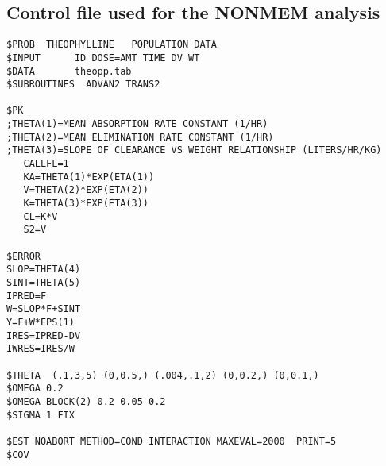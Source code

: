 \newpage
{}
\subsection*{Control file used for the NONMEM analysis}\label{sec:appanalctr}
{\small
\begin{verbatim}
$PROB  THEOPHYLLINE   POPULATION DATA
$INPUT      ID DOSE=AMT TIME DV WT
$DATA       theopp.tab
$SUBROUTINES  ADVAN2 TRANS2 

$PK
;THETA(1)=MEAN ABSORPTION RATE CONSTANT (1/HR)
;THETA(2)=MEAN ELIMINATION RATE CONSTANT (1/HR)
;THETA(3)=SLOPE OF CLEARANCE VS WEIGHT RELATIONSHIP (LITERS/HR/KG)
   CALLFL=1
   KA=THETA(1)*EXP(ETA(1))
   V=THETA(2)*EXP(ETA(2))
   K=THETA(3)*EXP(ETA(3))
   CL=K*V
   S2=V

$ERROR
SLOP=THETA(4)
SINT=THETA(5)
IPRED=F
W=SLOP*F+SINT
Y=F+W*EPS(1)
IRES=IPRED-DV
IWRES=IRES/W

$THETA  (.1,3,5) (0,0.5,) (.004,.1,2) (0,0.2,) (0,0.1,)
$OMEGA 0.2 
$OMEGA BLOCK(2) 0.2 0.05 0.2
$SIGMA 1 FIX

$EST NOABORT METHOD=COND INTERACTION MAXEVAL=2000  PRINT=5
$COV
\end{verbatim}
}
\newpage
{}

